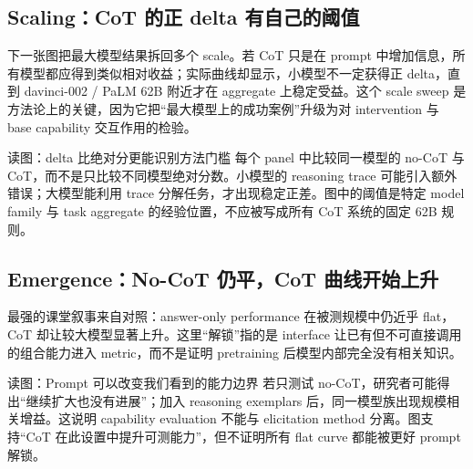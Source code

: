 
\subsection{Scaling：CoT 的正 delta 有自己的阈值}

下一张图把最大模型结果拆回多个 scale。若 CoT 只是在 prompt 中增加信息，所有模型都应得到类似相对收益；实际曲线却显示，小模型不一定获得正 delta，直到 davinci-002 / PaLM 62B 附近才在 aggregate 上稳定受益。这个 scale sweep 是方法论上的关键，因为它把“最大模型上的成功案例”升级为对 intervention 与 base capability 交互作用的检验。


\begin{knowledgebox}{读图：delta 比绝对分更能识别方法门槛}
每个 panel 中比较同一模型的 no-CoT 与 CoT，而不是只比较不同模型绝对分数。小模型的 reasoning trace 可能引入额外错误；大模型能利用 trace 分解任务，才出现稳定正差。图中的阈值是特定 model family 与 task aggregate 的经验位置，不应被写成所有 CoT 系统的固定 62B 规则。
\end{knowledgebox}

\subsection{Emergence：No-CoT 仍平，CoT 曲线开始上升}

最强的课堂叙事来自对照：answer-only performance 在被测规模中仍近乎 flat，CoT 却让较大模型显著上升。这里“解锁”指的是 interface 让已有但不可直接调用的组合能力进入 metric，而不是证明 pretraining 后模型内部完全没有相关知识。


\begin{knowledgebox}{读图：Prompt 可以改变我们看到的能力边界}
若只测试 no-CoT，研究者可能得出“继续扩大也没有进展”；加入 reasoning exemplars 后，同一模型族出现规模相关增益。这说明 capability evaluation 不能与 elicitation method 分离。图支持“CoT 在此设置中提升可测能力”，但不证明所有 flat curve 都能被更好 prompt 解锁。
\end{knowledgebox}

